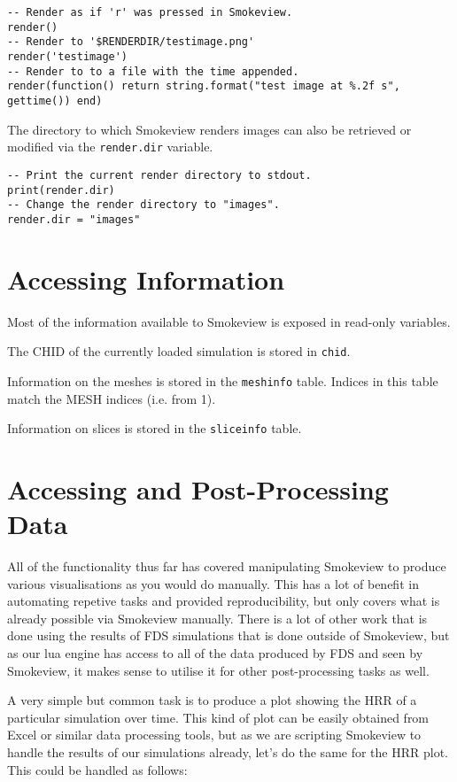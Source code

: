 \documentclass[11pt,twoside]{book}
\begin{document}
\begin{lstlisting}[style=lua]
-- Render as if 'r' was pressed in Smokeview.
render()
-- Render to '$RENDERDIR/testimage.png'
render('testimage')
-- Render to to a file with the time appended.
render(function() return string.format("test image at %.2f s", gettime()) end)
\end{lstlisting}

The directory to which Smokeview renders images can also be retrieved or
modified via the \lstinline{render.dir} variable.

\begin{lstlisting}[style=lua]
-- Print the current render directory to stdout.
print(render.dir)
-- Change the render directory to "images".
render.dir = "images"
\end{lstlisting}

\section{Accessing Information}

Most of the information available to Smokeview is exposed in read-only
variables.

The CHID of the currently loaded simulation is stored in \lstinline{chid}.

Information on the meshes is stored in the \lstinline{meshinfo} table. Indices
in this table match the MESH indices (i.e. from 1).

Information on slices is stored in the \lstinline{sliceinfo} table.

\section{Accessing and Post-Processing Data}

All of the functionality thus far has covered manipulating Smokeview to produce
various visualisations as you would do manually. This has a lot of benefit in
automating repetive tasks and provided reproducibility, but only covers what is
already possible via Smokeview manually. There is a lot of other work that is
done using the results of FDS simulations that is done outside of Smokeview, but
as our lua engine has access to all of the data produced by FDS and seen by
Smokeview, it makes sense to utilise it for other post-processing tasks as well.

A very simple but common task is to produce a plot showing the HRR of a
particular simulation over time. This kind of plot can be easily obtained from
Excel or similar data processing tools, but as we are scripting Smokeview to
handle the results of our simulations already, let's do the same for the HRR
plot. This could be handled as follows:
\end{document}
